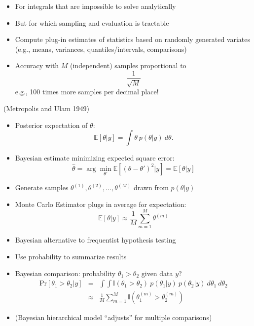 \documentclass[10pt]{report}
\newcommand{\sld}[1]{\newpage{\noindent\LARGE \ \ \
    \textcolor{MidnightBlue}{\bfseries #1}}\vspace*{4pt}}
\begin{document}
\sld{Monte Carlo Methods}
\begin{itemize}
\item For integrals that are impossible to solve analytically
\item But for which sampling and evaluation is tractable
\item Compute plug-in estimates of statistics based on
randomly generated variates (e.g., means, variances,
quantiles/intervals, comparisons)
\item Accuracy with $M$ (independent) samples proportional to
\[
\frac{1}{\sqrt{M}}
\]
e.g., 100 times more samples per decimal place!
\end{itemize}
\vfill\hfill
{\small (Metropolis and Ulam 1949)}


\sld{Monte Carlo Example}
\begin{itemize}
\item Posterior expectation of $\theta$:
\[
\mathbb{E}[\theta|y] = \int \theta \ p(\theta|y) \ d\theta.
\]
\item Bayesian estimate minimizing expected square error: 
\[
\hat{\theta} 
= \arg\min_{\theta'}
\mathbb{E}[(\theta - \theta')^2|y]
= \mathbb{E}[\theta|y] 
\]
\item Generate samples $\theta^{(1)}, \theta^{(2)}, \ldots,
 \theta^{(M)}$ drawn from $p(\theta|y)$
\item Monte Carlo Estimator plugs in average for expectation:
\[
\mathbb{E}[\theta|y] \approx \frac{1}{M} \sum_{m=1}^M \theta^{(m)}
\]
\end{itemize}

\sld{Monte Carlo Example II}
\begin{itemize}
\item Bayesian alternative to frequentist hypothesis testing
\item Use probability to summarize results
\item Bayesian comparison: probability $\theta_1 > \theta_2$ given
  data $y$?
\begin{eqnarray*}
\mbox{Pr}[\theta_1 > \theta_2|y] 
& = & 
\int \int 
\mathbb{I}(\theta_1 > \theta_2) \ p(\theta_1|y) \ p(\theta_2|y)  
\ d\theta_1 \ d\theta_2
\\
& \approx & 
\frac{1}{M} \sum_{m=1}^M \mathbb{I}(\theta_1^{(m)} > \theta_2^{(m)})
\end{eqnarray*}
%
\item (Bayesian hierarchical model ``adjusts'' for multiple comparisons)
\end{itemize}
\end{document}
